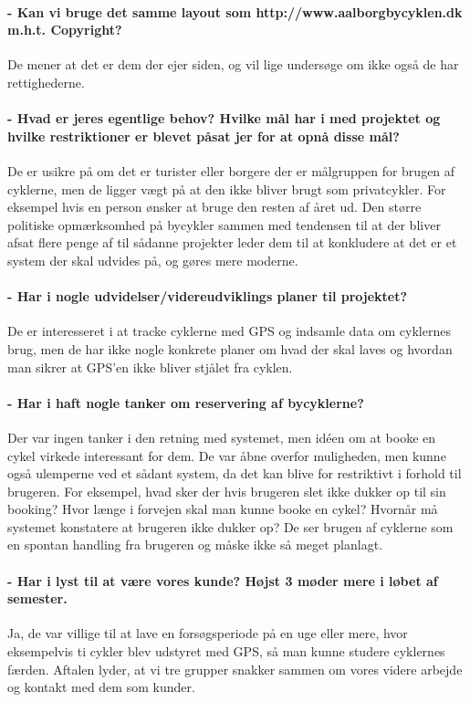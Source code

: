 \paragraph{- Kan vi bruge det samme layout som http://www.aalborgbycyklen.dk m.h.t. Copyright?}
De mener at det er dem der ejer siden, og vil lige undersøge om ikke også de har rettighederne.

\paragraph{- Hvad er jeres egentlige behov? Hvilke mål har i med projektet og hvilke restriktioner er blevet påsat jer for at opnå disse mål?}
De er usikre på om det er turister eller borgere der er målgruppen for brugen af cyklerne, men de ligger vægt på at den ikke
bliver brugt som privatcykler. For eksempel hvis en person ønsker at bruge den resten af året ud.
Den større politiske opmærksomhed på bycykler sammen med tendensen til at der bliver afsat flere penge af til sådanne projekter
leder dem til at konkludere at det er et system der skal udvides på, og gøres mere moderne.

\paragraph{- Har i nogle udvidelser/videreudviklings planer til projektet?}
De er interesseret i at tracke cyklerne med GPS og indsamle data om cyklernes brug, men de har ikke nogle konkrete planer om hvad
der skal laves og hvordan man sikrer at GPS'en ikke bliver stjålet fra cyklen.

\paragraph{- Har i haft nogle tanker om reservering af bycyklerne?}
Der var ingen tanker i den retning med systemet, men idéen om at booke en cykel virkede interessant for dem. De var åbne overfor
muligheden, men kunne også ulemperne ved et sådant system, da det kan blive for restriktivt i forhold til brugeren.
For eksempel, hvad sker der hvis brugeren slet ikke dukker op til sin booking? Hvor længe i forvejen skal man kunne booke en cykel?
Hvornår må systemet konstatere at brugeren ikke dukker op?
De ser brugen af cyklerne som en spontan handling fra brugeren og måske ikke så meget planlagt.
 
\paragraph{- Har i lyst til at være vores kunde? Højst 3 møder mere i løbet af semester.}
Ja, de var villige til at lave en forsøgsperiode på en uge eller mere, hvor eksempelvis ti cykler blev udstyret med GPS, så man kunne
studere cyklernes færden.
Aftalen lyder, at vi tre grupper snakker sammen om vores videre arbejde og kontakt med dem som kunder.

